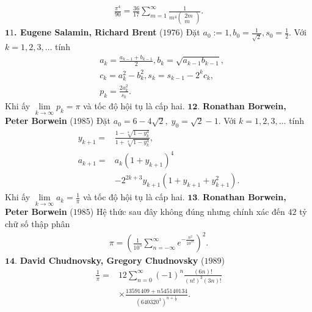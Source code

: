 \begin{multicols}{2}
	\begin{align*}
		\frac{{{\pi ^4}}}{{90}} = \frac{{36}}{{17}}\sum\limits_{m = 1}^\infty  {\frac{1}{{{m^4}\left( \begin{array}{l}
						2m\\
						m
					\end{array} \right)}}.} 
	\end{align*}
	$\pmb11$\textbf{\color{lichsutoanhoc}. Eugene Salamin, Richard Brent} ($1976$)
	\vskip 0.1cm
	Đặt $a_0 := 1, b_0 = \frac{1}{\sqrt{2}}, s_0 = \frac{1}{2}$.
	\vskip 0.1cm     
	Với $k = 1,2,3, \ldots$ tính 
	\begin{align*}
		&{a_k} = \frac{{{a_{k - 1}} + {b_{k - 1}}}}{2}, {b_k} = \sqrt {{a_{k - 1}}{b_{k - 1}}} ,\\
		& {c_k} = a_k^2 - b_k^2, {s_k} = {s_{k - 1}} - {2^k}{c_k}, \\
		&{p_k} = \frac{{2a_k^2}}{{{s_k}}}.
	\end{align*}
	Khi ấy $\mathop {\lim }\limits_{k \to \infty } {p_k} = \pi$   và tốc độ hội tụ là cấp hai. 
	\vskip 0.1cm
	$\pmb{12.}$ \textbf{\color{lichsutoanhoc}Ronathan Borwein, Peter Borwein} ($1985$)
	\vskip 0.1cm
	Đặt ${a_0} = 6 - 4\sqrt 2 ,\;{y_0} = \sqrt 2  - 1.$  
	\vskip 0.1cm
	Với $k = 1,2,3,\ldots$ tính 
	\begin{align*}
		{y_{k + 1}} =& \frac{{1 - \sqrt[4]{{1 - y_k^4}}}}{{1 + \sqrt[4]{{1 - y_k^4}}}},\\
		{a_{k + 1}} =& {a_k}{\left( {1 + {y_{k + 1}}} \right)^4} \\
		&- {2^{2k + 3}}{y_{k + 1}}\left( {1 + {y_{k + 1}} + y_{k + 1}^2} \right).
	\end{align*}
	Khi ấy $\mathop {\lim }\limits_{k \to \infty } {a_k} = \frac{1}{\pi }$  và tốc độ hội tụ là cấp hai.
	\vskip 0.1cm
	$\pmb{13.}$ \textbf{\color{lichsutoanhoc}Ronathan Borwein, Peter Borwein} ($1985$)
	\vskip 0.1cm
	Hệ thức sau đây không đúng nhưng chính xác đến $42$ tỷ chữ số thập phân
	\begin{align*}
		\pi  = {\left( {\frac{1}{{{{10}^5}}}\sum\limits_{n =  - \infty }^\infty  {{e^{ - \frac{{{n^2}}}{{{{10}^{10}}}}}}} } \right)^2}.
	\end{align*}
	$\pmb{14.}$ \textbf{\color{lichsutoanhoc}David Chudnovsky, Gregory Chudnovsky} ($1989$)
	\begin{align*}
		\frac{1}{\pi } =& 12\sum\limits_{n = 0}^\infty  {{{\left( { - 1} \right)}^n}\frac{{\left( {6n} \right)!}}{{{{\left( {n!} \right)}^3}\left( {3n} \right)!}}} \\
		&\times\frac{{13591409 + n545140134}}{{{{\left( {{{640320}^3}} \right)}^{n + \frac{1}{2}}}}}.

\end{align*}
\end{multicols}
